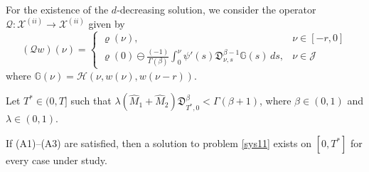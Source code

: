 \documentclass[reqno]{amsart}
\begin{document}
For the existence of the $d$-decreasing solution, we consider the operator
 $\mathcal{Q}: \mathcal{X}^{(ii)} \to \mathcal{X}^{(ii)}$ given by
\begin{equation} \label{sys32}
(\mathcal{Q} w)(\nu )=\begin{cases}
\varrho(\nu ), & \nu \in[- r, 0]  \\
\varrho(0) \ominus \frac{(-1)}{\Gamma(\beta)} \int_0^{\nu }
\psi'(s)\mathfrak{D}_{\nu ,s}^{\beta-1} \mathbb{G}(s)\,ds, & \nu \in\mathcal{J}
\end{cases}
\end{equation}
where $\mathbb{G}(\nu )=\mathcal{H}(\nu , w(\nu ), w(\nu - r))$.

Let $T^{*} \in (0,T]$ such that
$\lambda(\hat{M}_{1}+\hat{M}_{2})\mathfrak{D}_{T^{*},0}^{\beta}<\Gamma(\beta+1)$, 
where $\beta \in(0,1)$ and $\lambda \in(0,1)$.

\begin{theorem} \label{thm3.1}
If {\rm (A1)--(A3)} are satisfied, then a solution to problem \eqref{sys11} 
exists on \([0, T^*]\) for every case under study.
\end{theorem}
\end{document}
